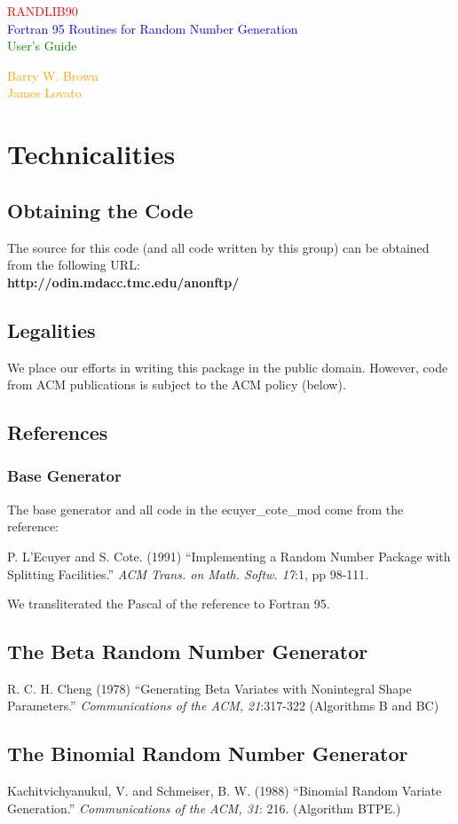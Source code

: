\documentclass[12pt,dvips]{article}
\newcommand{\mysection}[1]{\color{blue}
            \section{#1} \normalcolor}
\newcommand{\mysubsection}[1] {\color{green}
            \subsection{#1} \normalcolor}
\newcommand{\mysubsubsection}[1]{\color{Orange}
            \subsubsection{#1} \normalcolor}
\begin{document}

\vspace*{\fill}

{\Large \centering \textcolor {red} {RANDLIB90\\
\textcolor {blue}{Fortran 95 Routines for Random Number Generation}\\
\textcolor {green} {User's Guide}\\}}

\vspace{0.5in}

{\large \centering \textcolor{Orange}{Barry W. Brown\\
James Lovato\\}}

\vspace*{\fill}

\mysection{Technicalities}

\mysubsection{Obtaining the Code}

The source for this code (and all code written by this group) can be
obtained from the following URL:\\

{\bf http://odin.mdacc.tmc.edu/anonftp/\\}

\mysubsection{Legalities}

We place  our efforts  in writing this  package in the  public domain.
However,  code from  ACM publications  is  subject to  the ACM  policy
(below).

\mysubsection{References}

\mysubsubsection{Base Generator}

The base generator and all code in the ecuyer\_cote\_mod come from the
reference:

P.   L'Ecuyer  and S.  Cote.  (1991)  ``Implementing  a Random  Number
Package   with  Splitting   Facilities.''   {\em ACM   Trans.  on
Math. Softw. 17}:1, pp 98-111.

We transliterated the Pascal of the reference to Fortran 95.

\mysubsection{The Beta Random Number Generator}

R. C.   H. Cheng (1978)  ``Generating  Beta Variates  with Nonintegral
Shape  Parameters.''   {\em  Communications of   the  ACM, 21}:317-322
(Algorithms B and BC)

\mysubsection{The Binomial Random Number Generator}

Kachitvichyanukul, V. and   Schmeiser,
B.  W.  (1988)    ``Binomial   Random   Variate Generation.''     {\em
Communications of the ACM, 31}: 216.  (Algorithm BTPE.)
\end{document}
